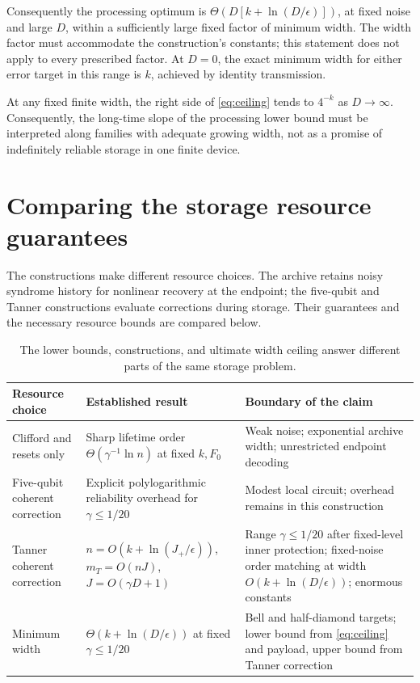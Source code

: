 \documentclass[11pt,a4paper]{article}
\numberwithin{equation}{section}
\theoremstyle{remark}\newtheorem*{remark}{Interpretation}
\newcommand{\eps}{\epsilon}
\begin{document}
Consequently the processing optimum is $\Theta(D[k+\ln(D/\eps)])$, at fixed noise and large $D$, within a sufficiently large fixed factor of minimum width. The width factor must accommodate the construction's constants; this statement does not apply to every prescribed factor. At $D=0$, the exact minimum width for either error target in this range is $k$, achieved by identity transmission.

At any fixed finite width, the right side of \eqref{eq:ceiling} tends to $4^{-k}$ as $D\to\infty$. Consequently, the long-time slope of the processing lower bound must be interpreted along families with adequate growing width, not as a promise of indefinitely reliable storage in one finite device.

\section{Comparing the storage resource guarantees}
The constructions make different resource choices. The archive retains noisy syndrome history for nonlinear recovery at the endpoint; the five-qubit and Tanner constructions evaluate corrections during storage. Their guarantees and the necessary resource bounds are compared below.

\begin{table}[ht]
\centering\small
\begin{tabularx}{\linewidth}{@{}>{\raggedright\arraybackslash}p{31mm}>{\raggedright\arraybackslash}X >{\raggedright\arraybackslash}X@{}}
\toprule
Resource choice & Established result & Boundary of the claim\\
\midrule
Clifford and resets only & Sharp lifetime order $\Theta(\gamma^{-1}\ln n)$ at fixed $k,F_0$ & Weak noise; exponential archive width; unrestricted endpoint decoding\\[4pt]
Five-qubit coherent correction & Explicit polylogarithmic reliability overhead for $\gamma\le1/20$ & Modest local circuit; overhead remains in this construction\\[4pt]
Tanner coherent correction & $n=O(k+\ln(J_+/\eps))$, $m_T=O(nJ)$, $J=O(\gamma D+1)$ & Range $\gamma\le1/20$ after fixed-level inner protection; fixed-noise order matching at width $O(k+\ln(D/\eps))$; enormous constants\\[4pt]
Minimum width & $\Theta(k+\ln(D/\eps))$ at fixed $\gamma\le1/20$ & Bell and half-diamond targets; lower bound from \eqref{eq:ceiling} and payload, upper bound from Tanner correction\\
\bottomrule
\end{tabularx}
\caption{The lower bounds, constructions, and ultimate width ceiling answer different parts of the same storage problem.}
\end{table}
\end{document}
